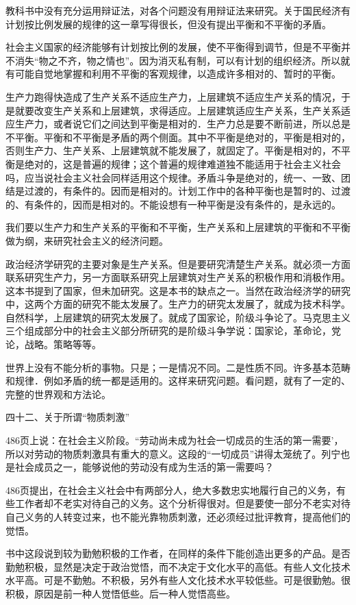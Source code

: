 教科书中没有充分运用辩证法，对各个问题没有用辩证法来研究。关于国民经济有计划按比例发展的规律的这一章写得很长，但没有提出平衡和不平衡的矛盾。

社会主义国家的经济能够有计划按比例的发展，使不平衡得到调节，但是不平衡并不消失“物之不齐，物之情也”。因为消灭私有制，可以有计划的组织经济。所以就有可能自觉地掌握和利用不平衡的客观规律，以造成许多相对的、暂时的平衡。

生产力跑得快造成了生产关系不适应生产力，上层建筑不适应生产关系的情况，于是就要改变生产关系和上层建筑，求得适应。上层建筑适应生产关系，生产关系适应生产力，或者说它们之间达到平衡是相对的．生产力总是要不断前进，所以总是不平衡。平衡和不平衡是矛盾的两个侧面。其中不平衡是绝对的，平衡是相对的，否则生产力、生产关系、上层建筑就不能发展了，就固定了。平衡是相对的，不平衡是绝对的，这是普遍的规律；这个普遍的规律难道独不能适用于社会主义社会吗，应当说社会主义社会同样适用这个规律。矛盾斗争是绝对的，统一、一致、团结是过渡的，有条件的。因而是相对的。计划工作中的各种平衡也是暂时的、过渡的、有条件的，因而是相对的。不能设想有一种平衡是没有条件的，是永远的。

我们要以生产力和生产关系的平衡和不平衡，生产关系和上层建筑的平衡和不平衡做为纲，来研究社会主义的经济问题。

政治经济学研究的主要对象是生产关系。但是要研究清楚生产关系。就必须一方面联系研究生产力，另一方面联系研究上层建筑对生产关系的积极作用和消极作用。这本书提到了国家，但未加研究。这是本书的缺点之一。当然在政治经济学的研究中，这两个方面的研究不能太发展了。生产力的研究太发展了，就成为技术科学。自然科学，上层建筑的研究太发展了。就成了国家论，阶级斗争论了。马克思主义三个组成部分中的社会主义部分所研究的是阶级斗争学说：国家论，革命论，党论，战略。策略等等。

世界上没有不能分析的事物。只是；一是情况不同。二是性质不同。许多基本范畴和规律．例如矛盾的统一都是适用的。这样来研究问题。看问题，就有了一定的、完整的世界观和方法论。

四十二、关于所谓“物质刺激”

486页上说：在社会主义阶段。“劳动尚未成为社会一切成员的生活的第一需要’，所以对劳动的物质刺激具有重大的意义。这段的“一切成员”讲得太笼统了。列宁也是社会成员之一，能够说他的劳动没有成为生活的第一需要吗？

486页提出，在社会主义社会中有两部分人，绝大多数忠实地履行自己的义务，有些工作者却不老实对待自己的义务。这个分析得很对。但是要使一部分不老实对待自己义务的人转变过来，也不能光靠物质刺激，还必须经过批评教育，提高他们的觉悟。

书中这段说到较为勤勉积极的工作者，在同样的条件下能创造出更多的产品。是否勤勉积极，显然是决定于政治觉悟，而不决定于文化水平的高低。有些人文化技术水平高。可是不勤勉。不积极，另外有些人文化技术水平较低些。可是很勤勉。很积极，原因是前一种人觉悟低些。后一种人觉悟高些。

